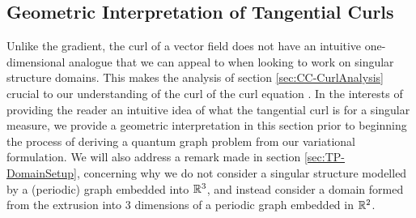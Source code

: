\subsection{Geometric Interpretation of Tangential Curls} \label{ssec:CC-Geometric}
Unlike the gradient, the curl of a vector field does not have an intuitive one-dimensional analogue that we can appeal to when looking to work on singular structure domains.
This makes the analysis of section \ref{sec:CC-CurlAnalysis} crucial to our understanding of the curl of the curl equation .
In the interests of providing the reader an intuitive idea of what the tangential curl is for a singular measure, we provide a geometric interpretation in this section prior to beginning the process of deriving a quantum graph problem from our variational formulation.
We will also address a remark made in section \ref{sec:TP-DomainSetup}, concerning why we do not consider a singular structure modelled by a (periodic) graph embedded into $\mathbb{R}^3$, and instead consider a domain formed from the extrusion into 3 dimensions of a periodic graph embedded in $\mathbb{R}^2$.

